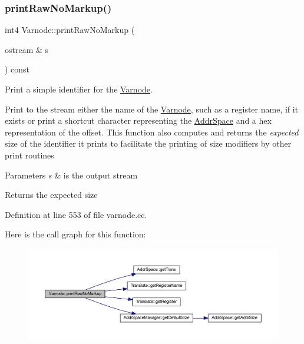 \subsubsection{\texorpdfstring{printRawNoMarkup()}{printRawNoMarkup()}}
{\footnotesize\ttfamily int4 Varnode\+::print\+Raw\+No\+Markup (\begin{DoxyParamCaption}\item[{ostream \&}]{s }\end{DoxyParamCaption}) const}



Print a simple identifier for the \mbox{\hyperlink{class_varnode}{Varnode}}. 

Print to the stream either the name of the \mbox{\hyperlink{class_varnode}{Varnode}}, such as a register name, if it exists or print a shortcut character representing the \mbox{\hyperlink{class_addr_space}{Addr\+Space}} and a hex representation of the offset. This function also computes and returns the {\itshape expected} size of the identifier it prints to facilitate the printing of size modifiers by other print routines 
\begin{DoxyParams}{Parameters}
{\em s} & is the output stream \\
\hline
\end{DoxyParams}
\begin{DoxyReturn}{Returns}
the expected size 
\end{DoxyReturn}


Definition at line 553 of file varnode.\+cc.

Here is the call graph for this function\+:
\nopagebreak
\begin{figure}[H]
\begin{center}
\leavevmode
\includegraphics[width=350pt]{class_varnode_aa90c838f1e0116747e09e3d1fe72b18e_cgraph}
\end{center}
\end{figure}
\mbox{\label{class_varnode_ab594852b697b20dea20d2f4d7551b8dd}} 
